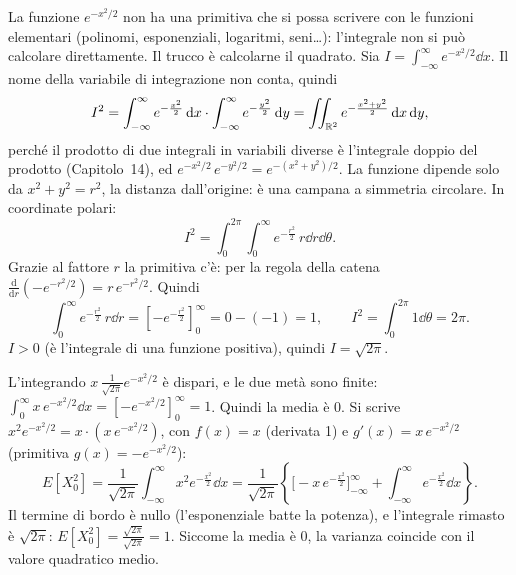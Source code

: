 \begin{dimostrazione}
 La funzione $e^{-x^2/2}$ non ha una primitiva che si possa scrivere con le funzioni elementari
(polinomi, esponenziali, logaritmi, seni\ldots): l'integrale non si può calcolare direttamente. Il trucco è calcolarne il
quadrato. Sia $I = \int_{-\infty}^{\infty} e^{-x^2/2} \dd x$.
 Il nome della variabile di integrazione non conta, quindi
\[ I^2 = \int_{-\infty}^{\infty} e^{-\frac{x^2}{2}} \,\mathrm{d} x \cdot \int_{-\infty}^{\infty} e^{-\frac{y^2}{2}} \,\mathrm{d} y =
   \iint_{\mathbb{R}^2} e^{-\frac{x^2 + y^2}{2}} \,\mathrm{d} x \,\mathrm{d} y , \]
perché il prodotto di due integrali in variabili diverse è l'integrale doppio del prodotto (Capitolo~14), ed
$e^{-x^2/2}\, e^{-y^2/2} = e^{-(x^2 + y^2)/2}$.
 La funzione dipende solo da $x^2 + y^2 = r^2$, la distanza dall'origine: è una campana a
simmetria circolare. In coordinate polari:
\[ I^2 = \int_0^{2\pi} \int_0^{\infty} e^{-\frac{r^2}{2}}\, r \dd r \dd\theta . \]
 Grazie al fattore $r$ la primitiva c'è: per la regola della catena
$\frac{\mathrm{d}}{\mathrm{d}r}\left( -e^{-r^2/2} \right) = r\, e^{-r^2/2}$. Quindi
\[ \int_0^{\infty} e^{-\frac{r^2}{2}}\, r \dd r = \left[ -e^{-\frac{r^2}{2}} \right]_0^{\infty} = 0 - (-1) = 1 , \qquad
   I^2 = \int_0^{2\pi} 1 \dd\theta = 2\pi . \]
 $I > 0$ (è l'integrale di una funzione positiva), quindi $I = \sqrt{2\pi}$.
\end{dimostrazione}


\begin{dimostrazione}
 L'integrando $x\, \frac{1}{\sqrt{2\pi}} e^{-x^2/2}$ è dispari, e le due metà sono finite:
$\int_0^{\infty} x\, e^{-x^2/2} \dd x = \left[ -e^{-x^2/2} \right]_0^{\infty} = 1$. Quindi la media è 0.
 Si scrive $x^2 e^{-x^2/2} = x \cdot \left( x\, e^{-x^2/2} \right)$, con
$f(x) = x$ (derivata 1) e $g'(x) = x\, e^{-x^2/2}$ (primitiva $g(x) = -e^{-x^2/2}$):
\[ E[X_0^2] = \frac{1}{\sqrt{2\pi}} \int_{-\infty}^{\infty} x^2 e^{-\frac{x^2}{2}} \dd x = \frac{1}{\sqrt{2\pi}} \left\{ \Big[
   -x\, e^{-\frac{x^2}{2}} \Big]_{-\infty}^{\infty} + \int_{-\infty}^{\infty} e^{-\frac{x^2}{2}} \dd x \right\} . \]
 Il termine di bordo è nullo (l'esponenziale batte la potenza), e l'integrale rimasto è $\sqrt{2\pi}$:
$E[X_0^2] = \frac{\sqrt{2\pi}}{\sqrt{2\pi}} = 1$. Siccome la media è 0, la varianza coincide con il valore quadratico medio.
\end{dimostrazione}

